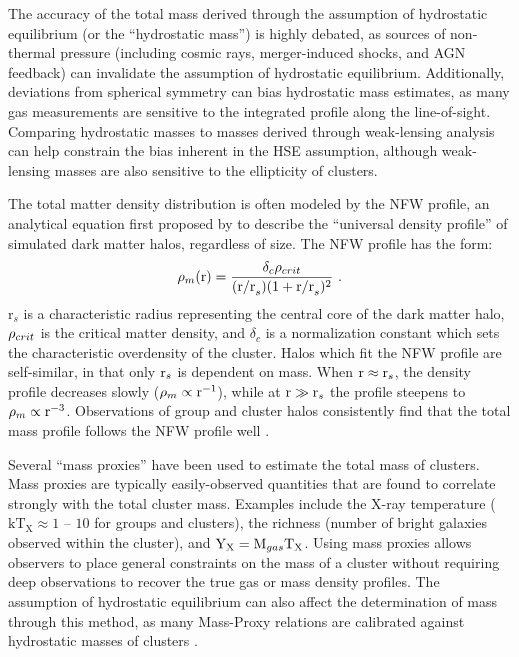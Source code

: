 The accuracy of the total mass derived through the assumption of
hydrostatic equilibrium (or the ``hydrostatic mass'') is highly
debated, as sources of non-thermal pressure (including cosmic rays,
merger-induced shocks, and AGN feedback) can invalidate the assumption
of hydrostatic equilibrium. Additionally, deviations from spherical
symmetry can bias hydrostatic mass estimates, as many gas measurements
are sensitive to the integrated profile along the
line-of-sight. Comparing hydrostatic masses to masses derived through
weak-lensing analysis can help constrain the bias inherent in the HSE
assumption, although weak-lensing masses are also sensitive to the
ellipticity of clusters.

The total matter density distribution is often modeled by the NFW
profile, an analytical equation first proposed by \citet{Navarro1996}
to describe the ``universal density profile'' of simulated dark matter
halos, regardless of size. The NFW profile has the form:
\begin{equation}
\rho_m(\textrm{r}) = \frac{\delta_c\rho_{crit}}{(\textrm{r/r}_s)(1 + \textrm{r/r}_s)^2}~.\nonumber
\end{equation}
r$_s$ is a characteristic radius representing the central core of the
dark matter halo, $\rho_{crit}$ is the critical matter density, and
$\delta_c$ is a normalization constant which sets the characteristic
overdensity of the cluster. Halos which fit the NFW profile are
self-similar, in that only $\textrm{r}_s$ is dependent on mass. When
$\textrm{r} \approx \textrm{r}_s$, the density profile decreases slowly
($\rho_m \propto \textrm{r}^{-1}$), while at $\textrm{r} \gg \textrm{r}_s$ the
profile steepens to $\rho_m \propto \textrm{r}^{-3}$. Observations of
group and cluster halos consistently find that the total mass profile
follows the NFW profile well
.

Several ``mass proxies'' have been used to estimate the total mass of
clusters. Mass proxies are typically easily-observed quantities that
are found to correlate strongly with the total cluster mass. Examples
include the X-ray temperature ($\textrm{kT}_\textrm{X}\approx1$ -- $10$ \keV{}
for groups and clusters), the richness (number of bright
galaxies observed within the cluster), and $\textrm{Y}_{\textrm{X}} =
\textrm{M}_{gas}\textrm{T}_\textrm{X}$. Using mass proxies allows observers
to place general constraints on the mass of a cluster without
requiring deep observations to recover the true gas or mass density
profiles. The assumption of hydrostatic equilibrium can also affect
the determination of mass through this method, as many Mass-Proxy
relations are calibrated against hydrostatic masses of clusters
.


